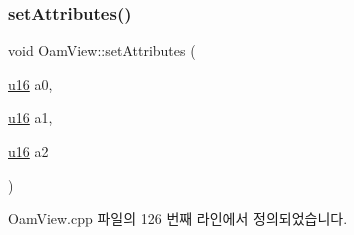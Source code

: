 \subsubsection{\texorpdfstring{set\+Attributes()}{setAttributes()}}
{\footnotesize\ttfamily void Oam\+View\+::set\+Attributes (\begin{DoxyParamCaption}\item[{\mbox{\hyperlink{_system_8h_a9e6c91d77e24643b888dbd1a1a590054}{u16}}}]{a0,  }\item[{\mbox{\hyperlink{_system_8h_a9e6c91d77e24643b888dbd1a1a590054}{u16}}}]{a1,  }\item[{\mbox{\hyperlink{_system_8h_a9e6c91d77e24643b888dbd1a1a590054}{u16}}}]{a2 }\end{DoxyParamCaption})}



Oam\+View.\+cpp 파일의 126 번째 라인에서 정의되었습니다.


